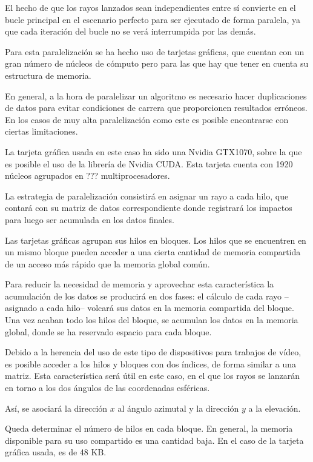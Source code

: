 El hecho de que los rayos lanzados sean independientes entre sí convierte en el bucle principal en el escenario perfecto para ser ejecutado de forma paralela, ya que cada iteración del bucle no se verá interrumpida por las demás.

Para esta paralelización se ha hecho uso de tarjetas gráficas, que cuentan con un gran número de núcleos de cómputo pero para las que hay que tener en cuenta su estructura de memoria.

En general, a la hora de paralelizar un algoritmo es necesario hacer duplicaciones de datos para evitar condiciones de carrera que proporcionen resultados erróneos.
En los casos de muy alta paralelización como este es posible encontrarse con ciertas limitaciones.

La tarjeta gráfica usada en este caso ha sido una Nvidia GTX1070, sobre la que es posible el uso de la librería de Nvidia CUDA.
Esta tarjeta cuenta con 1920 núcleos agrupados en ??? multiprocesadores.

La estrategia de paralelización consistirá en asignar un rayo a cada hilo, que contará con su matriz de datos correspondiente donde registrará los impactos para luego ser acumulada en los datos finales.

Las tarjetas gráficas agrupan sus hilos en bloques.
Los hilos que se encuentren en un mismo bloque pueden acceder a una cierta cantidad de memoria compartida de un acceso más rápido que la memoria global común.

Para reducir la necesidad de memoria y aprovechar esta característica la acumulación de los datos se producirá en dos fases: el cálculo de cada rayo --asignado a cada hilo-- volcará sus datos en la memoria compartida del bloque.
Una vez acaban todo los hilos del bloque, se acumulan los datos en la memoria global, donde se ha reservado espacio para cada bloque.

Debido a la herencia del uso de este tipo de dispositivos para trabajos de vídeo, es posible acceder a los hilos y bloques con dos índices, de forma similar a una matriz.
Esta característica será útil en este caso, en el que los rayos se lanzarán en torno a los dos ángulos de las coordenadas esféricas.

Así, se asociará la dirección $x$ al ángulo azimutal y la dirección $y$ a la elevación.

Queda determinar el número de hilos en cada bloque.
En general, la memoria disponible para su uso compartido es una cantidad baja.
En el caso de la tarjeta gráfica usada, es de 48 KB\cite{Nvidia}.

